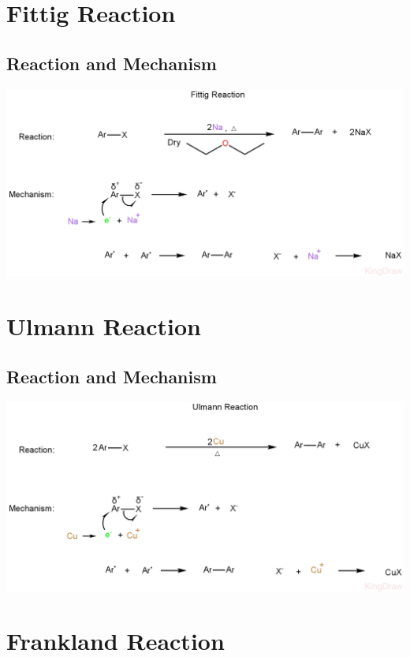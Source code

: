 \documentclass{article}
\begin{document}
\section{Fittig Reaction}
\subsection{Reaction and Mechanism}
\begin{center}
    \includegraphics[scale=0.25]{Chem(1)_1722165285036.JPEG}
\end{center}

\section{Ulmann Reaction}
\subsection{Reaction and Mechanism}
\begin{center}
    \includegraphics[scale=0.25]{UlmannReaction_1722165970453.JPEG}
\end{center}

\section{Frankland Reaction}
\end{document}
